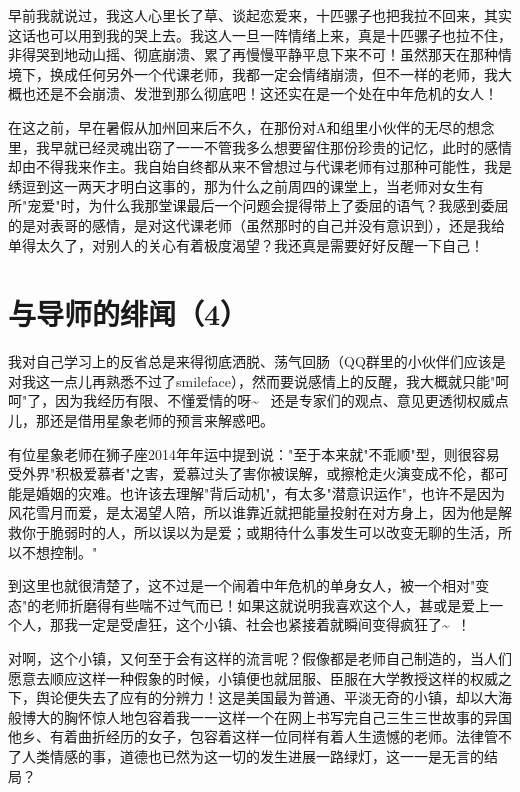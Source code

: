 \documentclass[12pt]{book}
\begin{document}
早前我就说过，我这人心里长了草、谈起恋爱来，十匹骡子也把我拉不回来，其实这话也可以用到我的哭上去。我这人一旦一阵情绪上来，真是十匹骡子也拉不住，非得哭到地动山摇、彻底崩溃、累了再慢慢平静平息下来不可！虽然那天在那种情境下，换成任何另外一个代课老师，我都一定会情绪崩溃，但不一样的老师，我大概也还是不会崩溃、发泄到那么彻底吧！这还实在是一个处在中年危机的女人！

在这之前，早在暑假从加州回来后不久，在那份对A和组里小伙伴的无尽的想念里，我早就已经灵魂出窃了一一不管我多么想要留住那份珍贵的记忆，此时的感情却由不得我来作主。我自始自终都从来不曾想过与代课老师有过那种可能性，我是绣逗到这一两天才明白这事的，那为什么之前周四的课堂上，当老师对女生有所"宠爱"时，为什么我那堂课最后一个问题会提得带上了委屈的语气？我感到委屈的是对表哥的感情，是对这代课老师（虽然那时的自己并没有意识到），还是我给单得太久了，对别人的关心有着极度渴望？我还真是需要好好反醒一下自己！

\section{与导师的绯闻（4）}
\label{sec-44-4}

我对自己学习上的反省总是来得彻底洒脱、荡气回肠（QQ群里的小伙伴们应该是对我这一点儿再熟悉不过了smileface），然而要说感情上的反醒，我大概就只能"呵呵"了，因为我经历有限、不懂爱情的呀\textasciitilde{}~ 还是专家们的观点、意见更透彻权威点儿，那还是借用星象老师的预言来解惑吧。

有位星象老师在狮子座2014年年运中提到说："至于本来就"不乖顺"型，则很容易受外界"积极爱慕者"之害，爱慕过头了害你被误解，或擦枪走火演变成不伦，都可能是婚姻的灾难。也许该去理解"背后动机"，有太多"潜意识运作"，也许不是因为风花雪月而爱，是太渴望人陪，所以谁靠近就把能量投射在对方身上，因为他是解救你于脆弱时的人，所以误以为是爱；或期待什么事发生可以改变无聊的生活，所以不想控制。"

到这里也就很清楚了，这不过是一个闹着中年危机的单身女人，被一个相对"变态"的老师折磨得有些喘不过气而已！如果这就说明我喜欢这个人，甚或是爱上一个人，那我一定是受虐狂，这个小镇、社会也紧接着就瞬间变得疯狂了\textasciitilde{}~！

对啊，这个小镇，又何至于会有这样的流言呢？假像都是老师自己制造的，当人们愿意去顺应这样一种假象的时候，小镇便也就屈服、臣服在大学教授这样的权威之下，舆论便失去了应有的分辨力！这是美国最为普通、平淡无奇的小镇，却以大海般博大的胸怀惊人地包容着我一一这样一个在网上书写完自己三生三世故事的异国他乡、有着曲折经历的女子，包容着这样一位同样有着人生遗憾的老师。法律管不了人类情感的事，道德也已然为这一切的发生进展一路绿灯，这一一是无言的结局？
\end{document}
